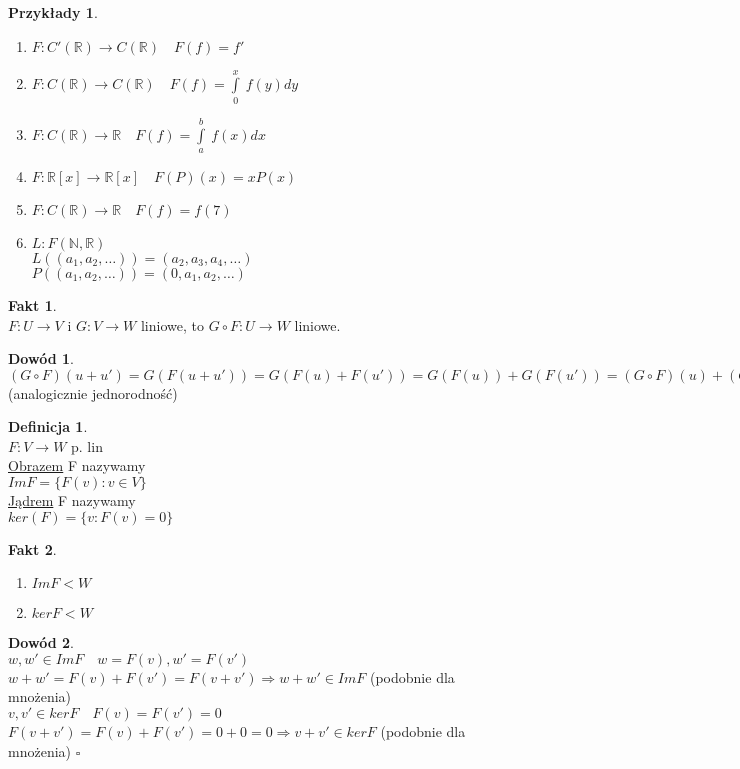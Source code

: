 \documentclass[12pt,a4paper]{article}
\newcommand{\RR}{\mathbb{R}}
\renewcommand{\qed}{$\square$}
\theoremstyle{plain}
\theoremstyle{definition}
\newtheorem{ft}{Fakt}[section]
\theoremstyle{definition}
\newtheorem{df}{Definicja}[section]
\theoremstyle{definition}
\theoremstyle{definition}
\newtheorem*{dd}{Dowód}
\theoremstyle{definition}
\theoremstyle{definition}
\theoremstyle{definition}
\newtheorem*{przy}{Przykłady}
\theoremstyle{definition}
\theoremstyle{definition}
\begin{document}
\begin{przy}
\begin{enumerate}[{(}1{)}]
        \item $F : C'(\RR) \rightarrow C(\RR) \quad F(f) = f'$ 
        \item $F: C(\RR) \rightarrow C(\RR) \quad F(f) = \int\limits_0^x \ f(y) dy$ 
        \item $F: C(\RR) \rightarrow \RR \quad F(f) = \int\limits_a^b \ f(x) dx$ 
        \item $F: \RR [x] \rightarrow \RR[x] \quad F(P)(x) = xP(x)$
        \item $F: C(\RR) \rightarrow \RR \quad F(f) =f(7)$
        \item $L: F(\mathbb{N},\RR)  $ \\ %
        $L((a_1,a_2,\dots)) = (a_2,a_3,a_4,\dots)$ \\
        $P((a_1,a_2,\dots)) = (0,a_1,a_2,\dots)$ 
    \end{enumerate}
\end{przy}
\begin{ft} \hfill 
    \\
    $F: U \rightarrow V $ i $G: V \rightarrow W$ liniowe, to $G \circ F: U \rightarrow W $ liniowe. 
\end{ft}

\begin{dd}
    $(G \circ F)(u+u') = G(F(u+u')) = G(F(u) + F(u')) = G(F(u)) + G(F(u')) = (G \circ F)(u) + (G \circ F)(u') $ (analogicznie jednorodność)
\end{dd}

\begin{df} \hfill \\
    $F: V \rightarrow W $ p. lin \\
    \underline{Obrazem} F nazywamy \\
    $Im F = \{ F(v): v \in V\}$ \\
    \underline{Jądrem} F nazywamy \\
    $ker(F) = \{v: F(v) = 0\}$ \\
\end{df} 
\begin{ft} \hfill 
    \begin{enumerate}[{(}1{)}]
        \item $Im F < W$
        \item $kerF < W$
    \end{enumerate}
\end{ft}

\begin{dd} 
    ~\\
    $w,w' \in Im F \quad w=F(v), w'=F(v')$ \\
    $w+w' = F(v) + F(v') = F(v+v') \Rightarrow w+w' \in ImF$ (podobnie dla mnożenia) \\
    $v,v' \in ker F \quad F(v) = F(v') = 0$ \\
    $F(v+v') = F(v) + F(v') = 0 + 0 = 0 \Rightarrow v+v' \in ker F$ (podobnie dla mnożenia)
    \qed
\end{dd}
\end{document}
